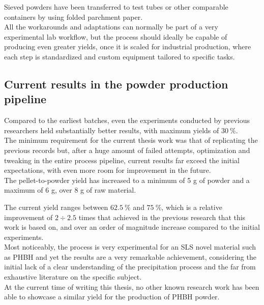 \documentclass{article}
\begin{document}
        Sieved powders have been transferred to test tubes or other comparable containers by using folded parchment paper. \\ 

        
        All the workarounds and adaptations can normally be part of a very experimental lab workflow, but the process should ideally 
        be capable of producing even greater yields, once it is scaled for industrial production, where each step is standardized 
        and custom equipment tailored to specific tasks. 

        \clearpage

        \subsection{Current results in the powder production pipeline \label{promising_results}}

        Compared to the earliest batches, even the experiments conducted by previous researchers held substantially better 
        results, with maximum yields of $30 \ \%$. \\ 

        The minimum requirement for the current thesis work was that of replicating the previous records but, after 
        a huge amount of failed attempts, optimization and tweaking in the entire process pipeline, current results 
        far exceed the initial expectations, with even more room for improvement in the future. \\ 

        The pellet-to-powder yield has increased to a minimum of 5 g of powder and a maximum of 6 g, over 8 g of raw material. 

        The current yield ranges between $62.5 \ \%$ and $75 \ \%$, which is a relative improvement of $2 \div 2.5$ times that 
        achieved in the previous research that this work is based on, and over an order of magnitude increase compared to the 
        initial experiments. \\ 

        Most noticeably, the process is very experimental for an SLS novel material such as PHBH and yet the results are 
        a very remarkable achievement, considering the initial lack of a clear understanding of the precipitation process 
        and the far from exhaustive literature on the specific subject. \\ 

        At the current time of writing this thesis, no other known research work has been able to showcase a similar yield 
        for the production of PHBH powder. \\  
\end{document}
